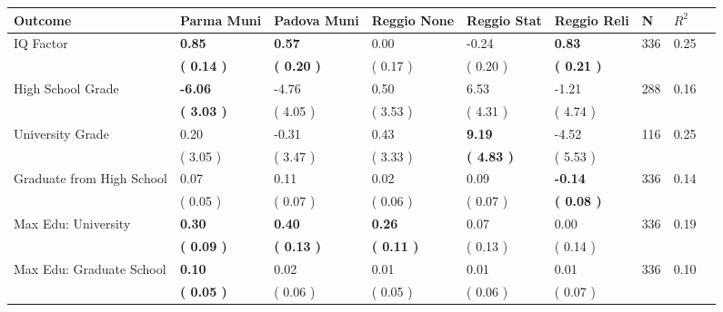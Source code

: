 \begin{tabular}{L{6.2cm} C{1.8cm} C{1.8cm} C{1.8cm} C{1.8cm} C{1.8cm} C{1.8cm} C{0.3cm} C{0.3cm}}
\toprule
 \textbf{Outcome} & \textbf{Parma Muni} & \textbf{Padova Muni} & \textbf{Reggio None} & \textbf{Reggio Stat} & \textbf{Reggio Reli} & \textbf{N} & \textbf{$ R^2$} \\
\midrule
IQ Factor & \textbf{     0.85} & \textbf{     0.57} &      0.00 &     -0.24 & \textbf{     0.83}  & 336 &       0.25 \\ 
 & \textbf{(     0.14 )} & \textbf{(     0.20 )} & (     0.17 ) & (     0.20 ) & \textbf{(     0.21 )}  & \\
High School Grade & \textbf{    -6.06} &     -4.76 &      0.50 &      6.53 &     -1.21  & 288 &       0.16 \\ 
 & \textbf{(     3.03 )} & (     4.05 ) & (     3.53 ) & (     4.31 ) & (     4.74 )  & \\
University Grade &      0.20 &     -0.31 &      0.43 & \textbf{     9.19} &     -4.52  & 116 &       0.25 \\ 
 & (     3.05 ) & (     3.47 ) & (     3.33 ) & \textbf{(     4.83 )} & (     5.53 )  & \\
Graduate from High School &      0.07 &      0.11 &      0.02 &      0.09 & \textbf{    -0.14}  & 336 &       0.14 \\ 
 & (     0.05 ) & (     0.07 ) & (     0.06 ) & (     0.07 ) & \textbf{(     0.08 )}  & \\
Max Edu: University & \textbf{     0.30} & \textbf{     0.40} & \textbf{     0.26} &      0.07 &      0.00  & 336 &       0.19 \\ 
 & \textbf{(     0.09 )} & \textbf{(     0.13 )} & \textbf{(     0.11 )} & (     0.13 ) & (     0.14 )  & \\
Max Edu: Graduate School & \textbf{     0.10} &      0.02 &      0.01 &      0.01 &      0.01  & 336 &       0.10 \\ 
 & \textbf{(     0.05 )} & (     0.06 ) & (     0.05 ) & (     0.06 ) & (     0.07 )  & \\
\bottomrule
\end{tabular}

